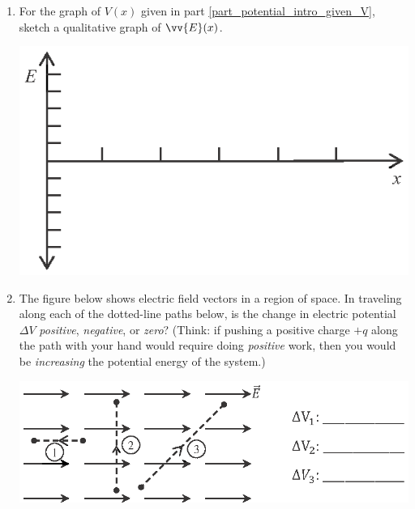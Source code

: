 \begin{enumerate}[wide, label=(\emph{\alph*})]
\item  For the graph of $V(x)$ given in part \ref{part_potential_intro_given_V}, sketch a qualitative graph of $\vv{E}(x)$.
\begin{center}
\includegraphics{potential_intro/activity_5_figs/E_axes.eps}
\end{center}

\pagebreak[2]
\item The figure below shows electric field vectors in a region of space.  In traveling  along each of the dotted-line paths below, is the change in electric potential $\Delta V$ \textit{positive},  \textit{negative}, or  \textit{zero}?  (Think: if pushing a positive charge $+q$ along the path with your hand would require doing \textit{positive} work, then you would  be \textit{increasing} the potential energy of the system.)
\begin{center}
\vspace{-0.1 in}
\includegraphics{potential_intro/activity_5_figs/uniform_E_field_1.eps}
\end{center}


\end{enumerate}
